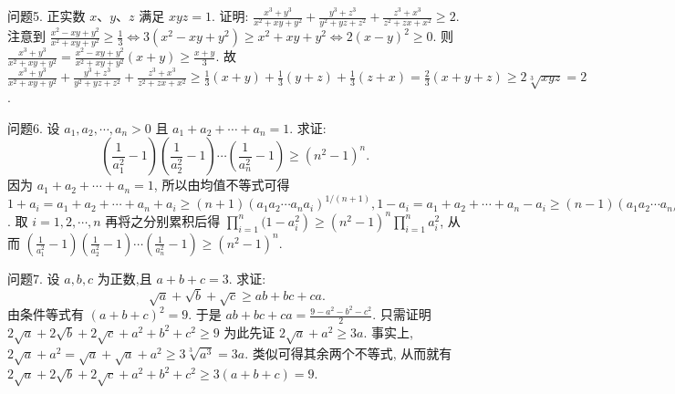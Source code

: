问题5. 正实数 $x 、 y 、 z$ 满足 $x y z=1$. 证明: $\frac{x^3+y^3}{x^2+x y+y^2}+\frac{y^3+z^3}{y^2+y z+z^2}+ \frac{z^3+x^3}{z^2+z x+x^2} \geqslant 2$.
注意到 $\frac{x^2-x y+y^2}{x^2+x y+y^2} \geqslant \frac{1}{3} \Leftrightarrow 3\left(x^2-x y+y^2\right) \geqslant x^2+x y+y^2 \Leftrightarrow 2(x- y)^2 \geqslant 0$. 则 $\frac{x^3+y^3}{x^2+x y+y^2}=\frac{x^2-x y+y^2}{x^2+x y+y^2}(x+y) \geqslant \frac{x+y}{3}$. 故 $\frac{x^3+y^3}{x^2+x y+y^2}+ \frac{y^3+z^3}{y^2+y z+z^2}+\frac{z^3+x^3}{z^2+z x+x^2} \geqslant \frac{1}{3}(x+y)+\frac{1}{3}(y+z)+\frac{1}{3}(z+x)=\frac{2}{3}(x+ y+z) \geqslant 2 \sqrt[3]{x y z}=2$.



问题6. 设 $a_1, a_2, \cdots, a_n>0$ 且 $a_1+a_2+\cdots+a_n=1$. 求证:
$$
\left(\frac{1}{a_1^2}-1\right)\left(\frac{1}{a_2^2}-1\right) \cdots\left(\frac{1}{a_n^2}-1\right) \geqslant\left(n^2-1\right)^n \text {. }
$$
因为 $a_1+a_2+\cdots+a_n=1$, 所以由均值不等式可得 $1+a_i=a_1+a_2 +\cdots+a_n+a_i \geqslant(n+1)\left(a_1 a_2 \cdots a_n a_i\right)^{1 /(n+1)}, 1-a_i=a_1+a_2+\cdots+a_n-a_i \geqslant (n-1)\left(a_1 a_2 \cdots a_n / a_i\right)^{1 /(n-1)}$. 取 $i=1,2, \cdots, n$ 再将之分别累积后得 $\prod_{i=1}^n(1- \left.a_i^2\right) \geqslant\left(n^2-1\right)^n \prod_{i=1}^n a_i^2$, 从而 $\left(\frac{1}{a_1^2}-1\right)\left(\frac{1}{a_2^2}-1\right) \cdots\left(\frac{1}{a_n^2}-1\right) \geqslant\left(n^2-1\right)^n$.



问题7. 设 $a, b, c$ 为正数,且 $a+b+c=3$. 求证:
$$
\sqrt{a}+\sqrt{b}+\sqrt{c} \geqslant a b+b c+c a .
$$
由条件等式有 $(a+b+c)^2=9$. 于是 $a b+b c+c a=\frac{9-a^2-b^2-c^2}{2}$. 只需证明 $2 \sqrt{a}+2 \sqrt{b}+2 \sqrt{c}+a^2+b^2+c^2 \geqslant 9$ 为此先证 $2 \sqrt{a}+a^2 \geqslant 3 a$. 事实上, $2 \sqrt{a}+a^2=\sqrt{a}+\sqrt{a}+a^2 \geqslant 3 \sqrt[3]{a^3}=3 a$. 类似可得其余两个不等式, 从而就有 $2 \sqrt{a}+2 \sqrt{b}+2 \sqrt{c}+a^2+b^2+c^2 \geqslant 3(a+b+c)=9$.



